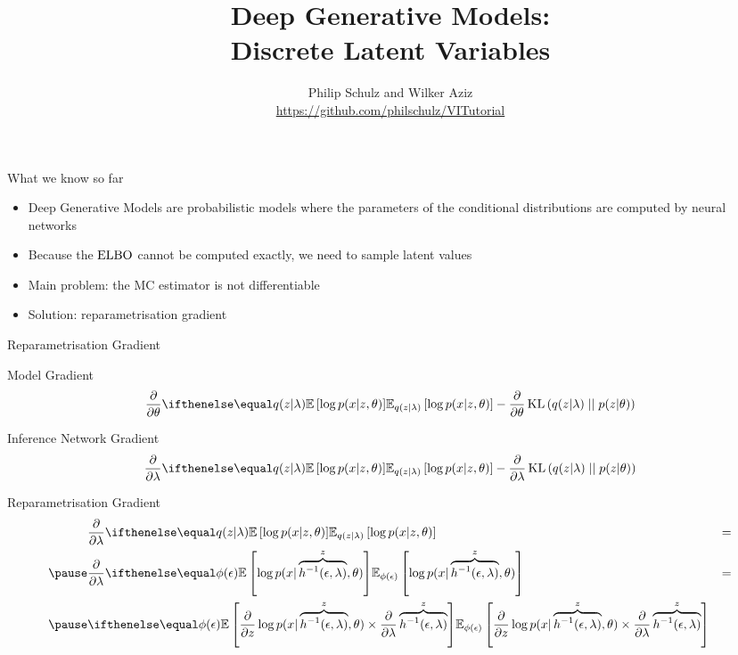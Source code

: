 \documentclass[14pt]{beamer}
\title{Deep Generative Models:\\
Discrete Latent Variables}
\author{Philip Schulz and Wilker Aziz\\
\url{https://github.com/philschulz/VITutorial}}
\date{}
\begin{document}
\begin{frame}
\maketitle
\end{frame}

\begin{frame}{What we know so far}
\begin{itemize}
\item Deep Generative Models are probabilistic models where the parameters of the conditional
distributions are computed by neural networks
\pause
\item Because the $ \operatorname{ELBO} $ cannot be computed exactly, we need to sample latent values
\pause
\item Main problem: the MC estimator is not differentiable
\pause
\item Solution: reparametrisation gradient
\end{itemize}
\end{frame}

\begin{frame}{Reparametrisation Gradient}
\begin{block}{Model Gradient}
\begin{equation*}
\frac{\partial}{\partial \theta}\E[q(z|\lambda)]{\log p(x|z,\theta)} - \frac{\partial}{\partial \theta}\KL{q(z|\lambda)}{p(z|\theta)}
\end{equation*}
\end{block}
\pause
\begin{block}{Inference Network Gradient}
\begin{equation*}
\frac{\partial}{\partial \lambda}\E[q(z|\lambda)]{\log p(x|z,\theta)} - \frac{\partial}{\partial \lambda}\KL{q(z|\lambda)}{p(z|\theta)}
\end{equation*}
\end{block}
\end{frame}

\begin{frame}{Reparametrisation Gradient}
\begin{equation*}
\begin{aligned}
&\frac{\partial}{\partial \lambda}\E[q(z|\lambda)]{\log p(x|z,\theta)} &= \\
\pause
&\frac{\partial}{\partial \lambda}\E[\phi(\epsilon)]{\log p(x|\overbrace{h^{-1}(\epsilon, \lambda)}^{z},\theta)} &= \\
\pause
&\E[\phi(\epsilon)]{\frac{\partial}{\partial z}\log p(x|\overbrace{h^{-1}(\epsilon, \lambda)}^{z},\theta) \times \frac{\partial}{\partial \lambda}
\overbrace{h^{-1}(\epsilon, \lambda)}^{z}} &
\end{aligned}
\end{equation*}
\end{frame}
\end{document}
